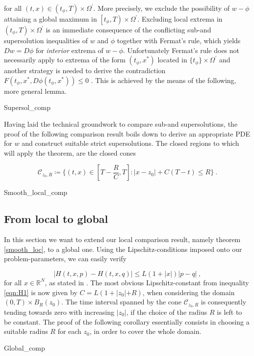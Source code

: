 		for all $ (t, x) \in \left( t_{\phi}, T \right) \times\Omega^{\prime} $. More precisely, we exclude the possibility of $ w -\phi $ attaining a global maximum in $ \left[ t_{\phi}, T \right) \times \Omega^{\prime} $. Excluding local extrema in ${ \left( t_{\phi}, T \right) \times \Omega^{\prime} }$ is an immediate consequence of the conflicting sub-and supersolution inequalities of $ w $ and $ \phi $ together with Fermat's rule, which yields $ Dw = D\phi $ for \emph{interior} extrema of $ w - \phi $. Unfortunately Fermat's rule does not necessarily apply to extrema of the form $ (t_{\phi}, x^{*}) $ located in $ \{t_{\phi} \}\times \Omega^{\prime}  $ and another strategy is needed to derive the contradiction $ F(t_{\phi}, x^{*}, D\phi(t_\phi, x^{*})) \leq 0 $ . This is achieved by the means of the following, more general lemma.
		
		{Supersol_comp}
	
		Having laid the technical groundwork to compare sub-and supersolutions, the proof of the following comparison result boils down to derive an appropriate PDE for  $ w $ and construct suitable strict supersolutions. The closed regions to which will apply the theorem, are the closed cones
		
		\begin{equation*}
			\mathcal{C}_{z_0, R} \coloneqq \Bigg\{ (t, x) \in \left[ T - \frac{R}{C}, T \right]: \lvert x - z_0 \rvert + C(T-t) \leq R \Bigg\} \ .
		\end{equation*}
		
		{Smooth_local_comp}
	
	\subsection{From local to global}
		In this section we want to extend our local comparison result, namely theorem \ref{smooth_loc}, to a global one. Using the Lipschitz-conditions imposed onto our problem-parameters, we can easily verify
		
		\begin{equation}
			\label{varying_Lipschitz}
			\lvert H(t, x, p) - H(t, x, q) \rvert \leq L \left(1 + \lvert x \rvert \right) \lvert p - q \rvert \ ,
		\end{equation}
		for all $ x \in \mathbb{R}^{N} $, as stated in \cite[p.~167]{zhou}. The most obvious Lipschitz-constant from inequality \eqref{eqn:H1} is now given by $ C = L (1 + \lvert z_0 \lvert + R) $, when considering the domain $ \left(0, T \right) \times B_R(z_0) $. The time interval spanned by the cone $ \mathcal{C}_{z_0, R} $ is consequently tending towards zero with increasing $ \lvert z_0 \rvert $, if the choice of the radius $ R $ is left to be constant. The proof of the following corollary essentially consists in choosing a suitable radius $ R $ for each $ z_0 $, in order to cover the whole domain.
		
		{Global_comp}
		